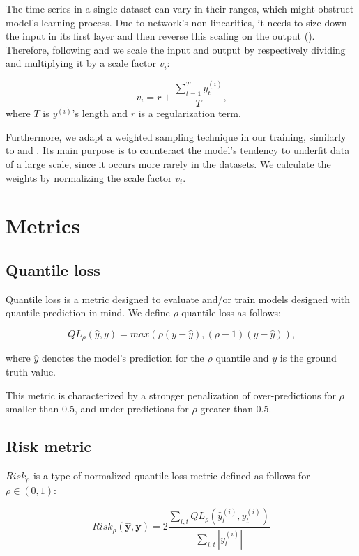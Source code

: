 \documentclass[en]{pracamgr}
\begin{document}
	The time series in a single dataset can vary in their ranges, which might obstruct model's learning process. Due to network's non-linearities, it needs to size down the input in its first layer and then reverse this scaling on the output (\cite{deepar}). Therefore, following \cite{enhancing} and \cite{deepar} we scale the input and output by respectively dividing and multiplying it by a scale factor $v_i$:
	
	$$ v_i = r + \frac{\sum^{T}_{t=1} y^{(i)}_t}{T} \text{,}$$
	where $T$ is $y^{(i)}$'s length and $r$ is a regularization term.
	
	Furthermore, we adapt a weighted sampling technique in our training, similarly to \cite{enhancing} and \cite{deepar}. Its main purpose is to counteract the model's tendency to underfit data of a large scale, since it occurs more rarely in the datasets. 
	We calculate the weights by normalizing the scale factor $v_i$.
	
	\section{Metrics}
	
	\subsection{Quantile loss}
	
	Quantile loss is a metric designed to evaluate and/or train models designed with quantile prediction in mind.
	We define $\rho$-quantile loss as follows:
	
	$$ QL_\rho(\hat{y}, y) = max(\rho(y - \hat{y}), (\rho - 1)(y - \hat{y})) \text{,} $$
	
	where $\hat{y}$ denotes the model's prediction for the $\rho$ quantile and $y$ is the ground truth value.
	
	This metric is characterized by a stronger penalization of over-predictions for $\rho$ smaller than 0.5, and under-predictions for $\rho$ greater than 0.5.
	
	\subsection{Risk metric}\label{s:risk}
	
	$Risk_\rho$ is a type of normalized quantile loss metric defined as follows for $\rho \in (0,1)$:
	
	$$ Risk_\rho(\hat{\textbf{y}}, \textbf{y}) 
	= 2\frac{\sum_{i,t}QL_\rho(\hat{y}^{(i)}_t, y^{(i)}_t)}
	{\sum_{i,t} |y^{(i)}_t|}$$
	
\end{document}
